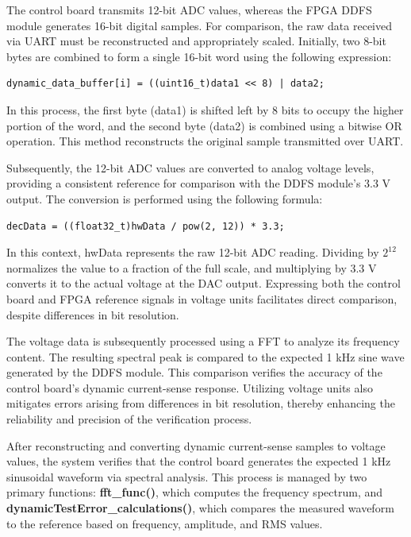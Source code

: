 The control board transmits 12-bit \acs{ADC} values, whereas the \acs{FPGA} \acs{DDFS} module generates 16-bit digital samples. For comparison, the raw data received via \acs{UART} must be reconstructed and appropriately scaled. Initially, two 8-bit bytes are combined to form a single 16-bit word using the following expression:


\begin{lstlisting}
dynamic_data_buffer[i] = ((uint16_t)data1 << 8) | data2;
\end{lstlisting}

In this process, the first byte (data1) is shifted left by 8 bits to occupy the higher portion of the word, and the second byte (data2) is combined using a bitwise OR operation. This method reconstructs the original sample transmitted over \acs{UART}.

Subsequently, the 12-bit \acs{ADC} values are converted to analog voltage levels, providing a consistent reference for comparison with the \acs{DDFS} module's 3.3 V output. The conversion is performed using the following formula:

\begin{lstlisting}
decData = ((float32_t)hwData / pow(2, 12)) * 3.3;
\end{lstlisting}

In this context, hwData represents the raw 12-bit \acs{ADC} reading. Dividing by $2^{12}$ normalizes the value to a fraction of the full scale, and multiplying by 3.3 V converts it to the actual voltage at the \acs{DAC} output. Expressing both the control board and \acs{FPGA} reference signals in voltage units facilitates direct comparison, despite differences in bit resolution.

The voltage data is subsequently processed using a \acs{FFT} to analyze its frequency content. The resulting spectral peak is compared to the expected 1 kHz sine wave generated by the \acs{DDFS} module. This comparison verifies the accuracy of the control board’s dynamic current-sense response. Utilizing voltage units also mitigates errors arising from differences in bit resolution, thereby enhancing the reliability and precision of the verification process.

After reconstructing and converting dynamic current-sense samples to voltage values, the system verifies that the control board generates the expected 1 kHz sinusoidal waveform via spectral analysis. This process is managed by two primary functions: \textbf{fft\_func()}, which computes the frequency spectrum, and \textbf{dynamicTestError\_calculations()}, which compares the measured waveform to the reference based on frequency, amplitude, and RMS values.

